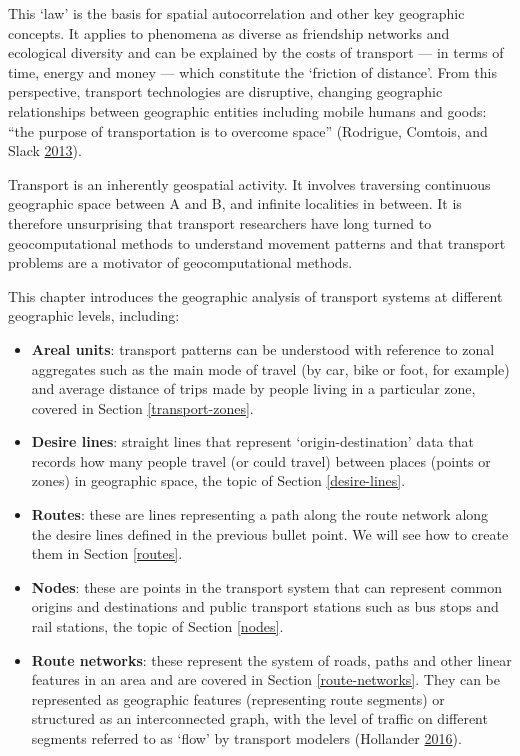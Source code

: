 \documentclass[]{krantz}
\providecommand{\tightlist}{%
  \setlength{\itemsep}{0pt}\setlength{\parskip}{0pt}}
\begin{document}
This `law' is the basis for spatial autocorrelation and other key geographic concepts.
It applies to phenomena as diverse as friendship networks and ecological diversity and can be explained by the costs of transport --- in terms of time, energy and money --- which constitute the `friction of distance'.
From this perspective, transport technologies are disruptive, changing geographic relationships between geographic entities including mobile humans and goods: ``the purpose of transportation is to overcome space'' (Rodrigue, Comtois, and Slack \protect\hyperlink{ref-rodrigue_geography_2013}{2013}).

Transport is an inherently geospatial activity.
It involves traversing continuous geographic space between A and B, and infinite localities in between.
It is therefore unsurprising that transport researchers have long turned to geocomputational methods to understand movement patterns and that transport problems are a motivator of geocomputational methods.

This chapter introduces the geographic analysis of transport systems at different geographic levels, including:

\begin{itemize}
\tightlist
\item
  \textbf{Areal units}: transport patterns can be understood with reference to zonal aggregates such as the main mode of travel (by car, bike or foot, for example) and average distance of trips made by people living in a particular zone, covered in Section \ref{transport-zones}.
\item
  \textbf{Desire lines}: straight lines that represent `origin-destination' data that records how many people travel (or could travel) between places (points or zones) in geographic space, the topic of Section \ref{desire-lines}.
\item
  \textbf{Routes}: these are lines representing a path along the route network along the desire lines defined in the previous bullet point.
  We will see how to create them in Section \ref{routes}.
\item
  \textbf{Nodes}: these are points in the transport system that can represent common origins and destinations and public transport stations such as bus stops and rail stations, the topic of Section \ref{nodes}.
\item
  \textbf{Route networks}: these represent the system of roads, paths and other linear features in an area and are covered in Section \ref{route-networks}. They can be represented as geographic features (representing route segments) or structured as an interconnected graph, with the level of traffic on different segments referred to as `flow' by transport modelers (Hollander \protect\hyperlink{ref-hollander_transport_2016}{2016}).
\end{itemize}
\end{document}
